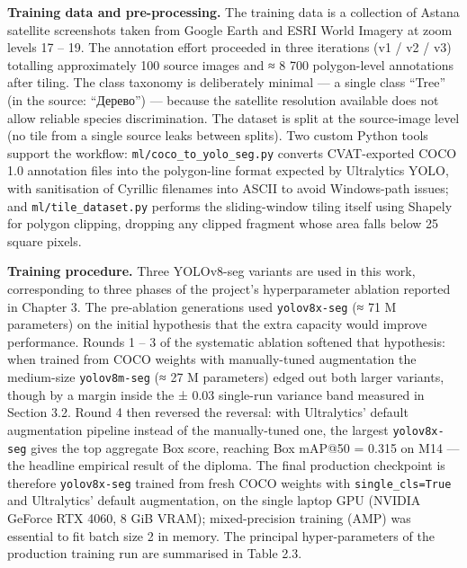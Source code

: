 \textbf{Training data and pre-processing.} The training data is a collection of Astana satellite screenshots taken from Google Earth and ESRI World Imagery at zoom levels 17 -- 19. The annotation effort proceeded in three iterations (v1 / v2 / v3) totalling approximately 100 source images and ≈ 8 700 polygon-level annotations after tiling. The class taxonomy is deliberately minimal --- a single class ``Tree'' (in the source: ``Дерево'') --- because the satellite resolution available does not allow reliable species discrimination. The dataset is split at the source-image level (no tile from a single source leaks between splits). Two custom Python tools support the workflow: \texttt{ml/coco\_to\_yolo\_seg.py} converts CVAT-exported COCO 1.0 annotation files into the polygon-line format expected by Ultralytics YOLO, with sanitisation of Cyrillic filenames into ASCII to avoid Windows-path issues; and \texttt{ml/tile\_dataset.py} performs the sliding-window tiling itself using Shapely for polygon clipping, dropping any clipped fragment whose area falls below 25 square pixels.

\textbf{Training procedure.} Three YOLOv8-seg variants are used in this work, corresponding to three phases of the project's hyperparameter ablation reported in Chapter 3. The pre-ablation generations used \texttt{yolov8x-seg} (≈ 71 M parameters) on the initial hypothesis that the extra capacity would improve performance. Rounds 1 -- 3 of the systematic ablation softened that hypothesis: when trained from COCO weights with manually-tuned augmentation the medium-size \texttt{yolov8m-seg} (≈ 27 M parameters) edged out both larger variants, though by a margin inside the ± 0.03 single-run variance band measured in Section 3.2. Round 4 then reversed the reversal: with Ultralytics' default augmentation pipeline instead of the manually-tuned one, the largest \texttt{yolov8x-seg} gives the top aggregate Box score, reaching Box mAP@50 = 0.315 on M14 --- the headline empirical result of the diploma. The final production checkpoint is therefore \texttt{yolov8x-seg} trained from fresh COCO weights with \texttt{single\_cls=True} and Ultralytics' default augmentation, on the single laptop GPU (NVIDIA GeForce RTX 4060, 8 GiB VRAM); mixed-precision training (AMP) was essential to fit batch size 2 in memory. The principal hyper-parameters of the production training run are summarised in Table 2.3.

